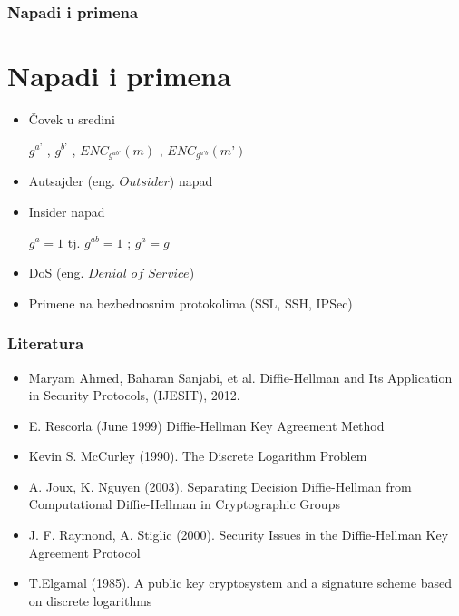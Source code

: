 \documentclass[14pt]{beamer}
\begin{document}
\begin{frame}[fragile]\frametitle{Napadi i primena}
\section{Napadi i primena}
	\begin{itemize}	
        \item Čovek u sredini 
        
        $g^{a’}$ , $g^{b’}$ , $ENC_{g^{ab’}} (m)$ , $ENC_{g^{a’b}} (m’)$
	\item Autsajder (eng. $Outsider$) napad
        \item Insider napad

        $g^{a} = 1$ tj. $g^{ab} = 1$ ; $g^a = g$
        \item DoS (eng. $Denial$ $of$ $Service$)
        \item Primene na bezbednosnim protokolima (SSL, SSH, IPSec)
	\end{itemize}
\end{frame}

\begin{frame}[fragile]\frametitle{Literatura}
	\begin{itemize}	
		\scriptsize \item Maryam Ahmed, Baharan Sanjabi, et al. Diffie-Hellman and Its Application in Security Protocols, (IJESIT), 2012.
		\scriptsize \item  E. Rescorla (June 1999) Diffie-Hellman Key Agreement Method
		\scriptsize \item  Kevin S. McCurley (1990). The Discrete Logarithm Problem
		\scriptsize \item  A. Joux, K. Nguyen (2003). Separating Decision Diffie-Hellman from
Computational Diffie-Hellman in Cryptographic Groups
        \scriptsize \item  J. F. Raymond, A. Stiglic (2000). Security Issues in the Diffie-Hellman
Key Agreement Protocol
        \scriptsize \item  T.Elgamal (1985). A public key cryptosystem and a signature scheme
based on discrete logarithms
	\end{itemize}
\end{frame}
\end{document}
